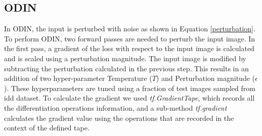     \subsection{ODIN}
    \label{ODIN_methodology}
    In ODIN, the input is perturbed with noise as shown in Equation \ref{perturbation}. To perform ODIN, two forward passes are needed to perturb the input image. In the first pass, a gradient of the loss with respect to the input image is calculated and is scaled using a perturbation magnitude. The input image is modified by subtracting the perturbation calculated in the previous step. This results in an addition of two hyper-parameter Temperature ($T$) and Perturbation magnitude ($\epsilon$). These hyperparameters are tuned using a fraction of test images sampled from \acrshort{idd} dataset. To calculate the gradient we used \textit{tf.GradientTape}, which records all the differentiation operations information, and a sub-method \textit{tf.gradient} calculates the gradient value using the operations that are recorded in the context of the defined tape. 
    
